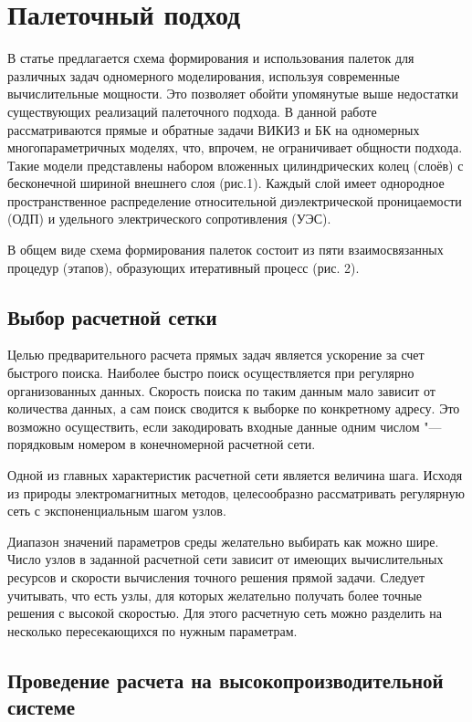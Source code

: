 \chapter{Палеточный подход} \label{chapt2}

В статье предлагается схема формирования и использования палеток для
различных задач одномерного моделирования, используя современные
вычислительные мощности. Это позволяет обойти упомянутые выше недостатки
существующих реализаций палеточного подхода. В данной работе
рассматриваются прямые и обратные задачи ВИКИЗ и БК на одномерных
многопараметричных моделях, что, впрочем, не ограничивает общности подхода.
Такие модели представлены набором вложенных цилиндрических колец (слоёв) с
бесконечной шириной внешнего слоя (рис.1). Каждый слой имеет однородное
пространственное распределение относительной диэлектрической проницаемости
(ОДП) и удельного электрического сопротивления (УЭС).

В общем виде схема формирования палеток состоит из пяти взаимосвязанных
процедур (этапов), образующих итеративный процесс (рис. 2).


\section{Выбор расчетной сетки} \label{sect2_1}

Целью предварительного расчета прямых задач является ускорение за счет
быстрого поиска. Наиболее быстро поиск осуществляется при регулярно
организованных данных. Скорость поиска по таким данным мало зависит от
количества данных, а сам поиск сводится к выборке по конкретному адресу.
Это возможно осуществить, если закодировать входные данные одним числом
"--- порядковым номером в конечномерной расчетной сети.

Одной из главных характеристик расчетной сети является величина шага.
Исходя из природы электромагнитных методов, целесообразно рассматривать
регулярную сеть с экспоненциальным шагом узлов.

Диапазон значений параметров среды желательно выбирать как можно шире.
Число узлов в заданной расчетной сети зависит от имеющих вычислительных
ресурсов и скорости вычисления точного решения прямой задачи. Следует
учитывать, что есть узлы, для которых желательно получать более точные
решения с высокой скоростью. Для этого расчетную сеть можно разделить  на
несколько пересекающихся по нужным параметрам.

\section{Проведение расчета на высокопроизводительной системе} \label{sect2_2}

